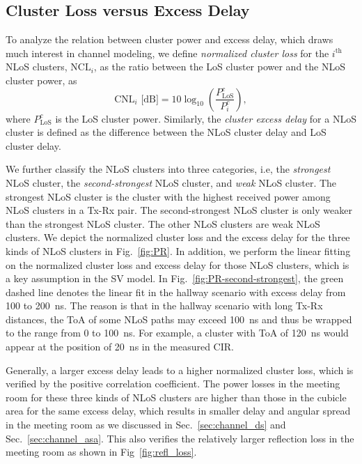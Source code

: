 \documentclass[journal,12pt,draftclsnofoot,onecolumn]{IEEEtran}
\begin{document}
\subsection{Cluster Loss versus Excess Delay}
To analyze the relation between cluster power and excess delay, which draws much interest in channel modeling, we define \textit{normalized cluster loss} for the $i^{\text{th}}$ NLoS clusters, $\text{NCL}_i$, as the ratio between the LoS cluster power and the NLoS cluster power, as
\begin{equation}
    \text{CNL}_i \text{ [dB]}=10\log_{10}(\frac{P^c_{\text{LoS}}}{P_i^c}),
\end{equation}
where $P^c_{\text{LoS}}$ is the LoS cluster power. Similarly, the \textit{cluster excess delay} for a NLoS cluster is defined as the difference between the NLoS cluster delay and LoS cluster delay.
\par We further classify the NLoS clusters into three categories, i.e, the \textit{strongest} NLoS cluster, the \textit{second-strongest} NLoS cluster, and \textit{weak} NLoS cluster. The strongest NLoS cluster is the cluster with the highest received power among NLoS clusters in a Tx-Rx pair. The second-strongest NLoS cluster is only weaker than the strongest NLoS cluster. The other NLoS clusters are weak NLoS clusters. We depict the normalized cluster loss and the excess delay for the three kinds of NLoS clusters in Fig.~\ref{fig:PR}. In addition, we perform the linear fitting on the normalized cluster loss and excess delay for those NLoS clusters, which is a key assumption in the SV model. In Fig.~\ref{fig:PR-second-strongest}, the green dashed line denotes the linear fit in the hallway scenario with excess delay from 100 to 200~ns. The reason is that in the hallway scenario with long Tx-Rx distances, the ToA of some NLoS paths may exceed 100~ns and thus be wrapped to the range from 0 to 100~ns. For example, a cluster with ToA of 120~ns would appear at the position of 20~ns in the measured CIR. 
\par Generally, a larger excess delay leads to a higher normalized cluster loss, which is verified by the positive correlation coefficient. The power losses in the meeting room for these three kinds of NLoS clusters are higher than those in the cubicle area for the same excess delay, which results in smaller delay and angular spread in the meeting room as we discussed in Sec.~\ref{sec:channel_ds} and Sec.~\ref{sec:channel_asa}. This also verifies the relatively larger reflection loss in the meeting room as shown in Fig~\ref{fig:refl_loss}.
\end{document}
